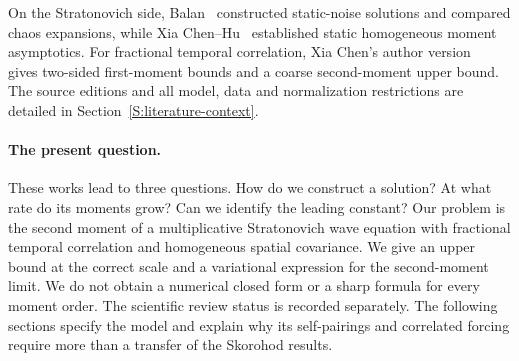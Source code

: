 On the Stratonovich side, Balan~\cite{balan:22:stratonovich} constructed
static-noise solutions and compared chaos expansions, while Xia
Chen--Hu~\cite{chen.hu:25:hyperbolic} established static homogeneous moment
asymptotics. For fractional temporal correlation, Xia Chen's author
version~\cite{chen:author2026:time-dependency} gives two-sided first-moment
bounds and a coarse second-moment upper bound. The source editions and all
model, data and normalization restrictions are detailed in
Section~\ref{S:literature-context}.

\paragraph{The present question.}
These works lead to three questions. How do we construct a solution? At what
rate do its moments grow? Can we identify the leading constant? Our problem is
the second moment of a multiplicative Stratonovich wave equation with fractional
temporal correlation and homogeneous spatial covariance. We give an upper bound
at the correct scale and a variational expression for the second-moment limit.
We do not obtain a numerical closed form or a sharp formula for every moment
order. The scientific review status is recorded separately. The following
sections specify the model and explain why its self-pairings and correlated
forcing require more than a transfer of the Skorohod results.
